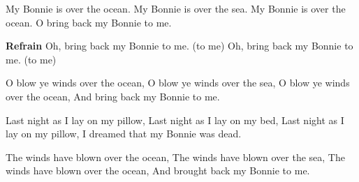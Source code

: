 \footnotemark [
ititle={My Bonnie}]


\beginverse
My Bonnie is over the ocean.
My Bonnie is over the sea.
My Bonnie is over the ocean.
O bring back my Bonnie to me.
\endverse

\beginchorus
\textbf{Refrain}
Oh, bring back my Bonnie to me. (to me)
Oh, bring back my Bonnie to me. (to me)
\endchorus

\beginverse
O blow ye winds over the ocean,
O blow ye winds over the sea,
O blow ye winds over the ocean,
And bring back my Bonnie to me.
\endverse

\beginverse
Last night as I lay on my pillow,
Last night as I lay on my bed,
Last night as I lay on my pillow,
I dreamed that my Bonnie was dead.
\endverse

\beginverse
The winds have blown over the ocean,
The winds have blown over the sea,
The winds have blown over the ocean,
And brought back my Bonnie to me.
\endverse
\endsong